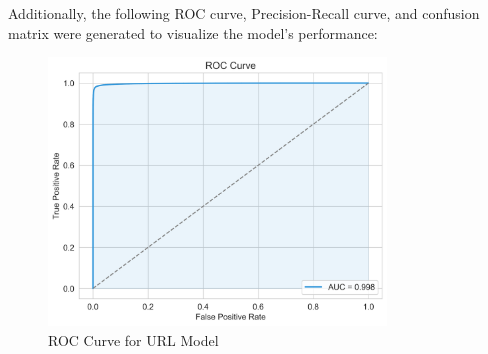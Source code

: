 \documentclass{article}
\begin{document}



\noindent
Additionally, the following ROC curve, Precision-Recall curve, and confusion matrix were generated to visualize the model's performance:

\begin{figure}[htbp]
    \centering
    \includegraphics[width=0.8\textwidth]{../analysis/url/roc_curve.png}
    \caption{ROC Curve for URL Model}
    \label{fig:roc_curve_1}
\end{figure}
\end{document}
